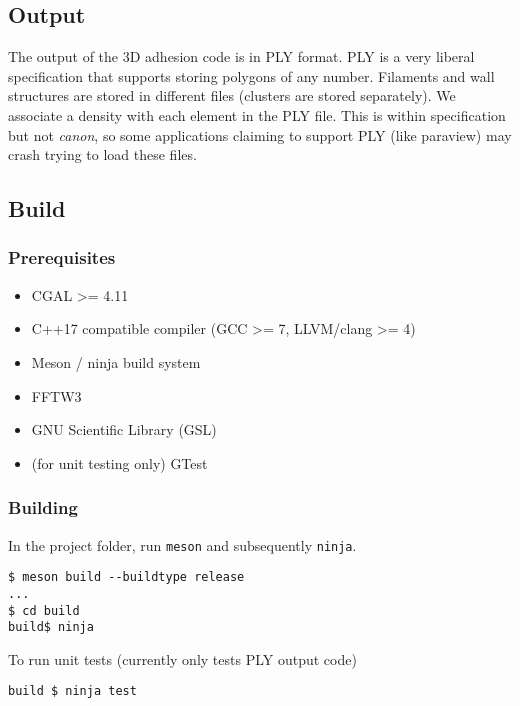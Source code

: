 \documentclass[11pt]{article}
\begin{document}
\subsection{Output}
\label{sec:org06f27f0}
The output of the 3D adhesion code is in PLY format. PLY is a very liberal specification that
supports storing polygons of any number. Filaments and wall structures are stored in different
files (clusters are stored separately). We associate a density with each element in the PLY file.
This is within specification but not \emph{canon}, so some applications claiming to support PLY
(like paraview) may crash trying to load these files.

\subsection{Build}
\label{sec:orgb7951f2}
\subsubsection{Prerequisites}
\label{sec:orgf108ac3}
\begin{itemize}
\item CGAL >= 4.11
\item C++17 compatible compiler (GCC >= 7, LLVM/clang >= 4)
\item Meson / ninja build system
\item FFTW3
\item GNU Scientific Library (GSL)
\item (for unit testing only) GTest
\end{itemize}

\subsubsection{Building}
\label{sec:orgf598aa9}
In the project folder, run \texttt{meson} and subsequently \texttt{ninja}.
\begin{verbatim}
$ meson build --buildtype release
...
$ cd build
build$ ninja
\end{verbatim}

To run unit tests (currently only tests PLY output code)

\begin{verbatim}
build $ ninja test
\end{verbatim}
\end{document}
